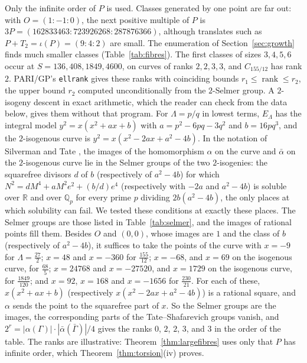 \documentclass[10pt]{article}
\newcommand{\Q}{\mathbb{Q}}
\newcommand{\R}{\mathbb{R}}
\begin{document}
Only the infinite order of $P$ is used. Classes generated by one point are far out: with $O=(1:-1:0)$, the next positive multiple of $P$ is $3P=(162833463:723926268:287876366)$, although translates such as $P+T_2=\iota(P)=(9:4:2)$ are small. The enumeration of Section~\ref{sec:growth} finds much smaller classes (Table~\ref{tab:fibres}). The first classes of sizes $3,4,5,6$ occur at $S=136,408,1849,4600$, on curves of ranks $2,2,3,3$, and $C_{155/12}$ has rank $2$. PARI/GP's \texttt{ellrank} \cite{pari2172} gives these ranks with coinciding bounds $r_1\le\operatorname{rank}\le r_2$, the upper bound $r_2$ computed unconditionally from the $2$-Selmer group. A $2$-isogeny descent in exact arithmetic, which the reader can check from the data below, gives them without that program. For $\Lambda=p/q$ in lowest terms, $E_\Lambda$ has the integral model $y^2=x(x^2+ax+b)$ with $a=p^2-6pq-3q^2$ and $b=16pq^3$, and the $2$-isogenous curve is $y^2=x(x^2-2ax+a^2-4b)$. In the notation of Silverman and Tate \cite[Chapter~III, Section~6]{silvermantate2015}, the images of the homomorphism $\alpha$ on the curve and $\bar\alpha$ on the $2$-isogenous curve lie in the Selmer groups of the two $2$-isogenies: the squarefree divisors $d$ of $b$ (respectively of $a^2-4b$) for which $N^2=dM^4+aM^2e^2+(b/d)e^4$ (respectively with $-2a$ and $a^2-4b$) is soluble over $\R$ and over $\Q_p$ for every prime $p$ dividing $2b(a^2-4b)$, the only places at which solubility can fail. We tested these conditions at exactly these places. The Selmer groups are those listed in Table~\ref{tab:selmer}, and the images of rational points fill them. Besides $O$ and $(0,0)$, whose images are $1$ and the class of $b$ (respectively of $a^2-4b$), it suffices to take the points of the curve with $x=-9$ for $\Lambda=\frac{27}2$; $x=48$ and $x=-360$ for $\frac{155}{12}$; $x=-68$, and $x=69$ on the isogenous curve, for $\frac{68}5$; $x=24768$ and $x=-27520$, and $x=1729$ on the isogenous curve, for $\frac{1849}{120}$; and $x=92$, $x=168$ and $x=-1656$ for $\frac{230}{21}$. For each of these, $x(x^2+ax+b)$ (respectively $x(x^2-2ax+a^2-4b)$) is a rational square, and $\alpha$ sends the point to the squarefree part of $x$. So the Selmer groups are the images, the corresponding parts of the Tate--Shafarevich groups vanish, and $2^r=|\alpha(\Gamma)|\cdot|\bar\alpha(\bar\Gamma)|/4$ gives the ranks $0$, $2$, $2$, $3$, and $3$ in the order of the table. The ranks are illustrative: Theorem~\ref{thm:largefibres} uses only that $P$ has infinite order, which Theorem~\ref{thm:torsion}(iv) proves.
\end{document}
